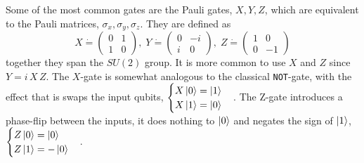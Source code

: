 Some of the most common gates are the Pauli gates, $X,Y,Z$, which are equivalent to the Pauli matrices, $\sigma_x,\sigma_y,\sigma_z$. 
They are defined as
\begin{equation}
X \dot{=}\begin{pmatrix}
0 & 1 \\ 1 & 0
\end{pmatrix},\; 
Y\dot{=}\begin{pmatrix}
0 & -i \\ i & 0
\end{pmatrix},\; 
Z \dot{=} \begin{pmatrix}
1 & 0 \\ 0 & -1
\end{pmatrix}
\end{equation}
together they span the $SU(2)$ group.  
It is more common to use $X$ and $Z$ since $Y = i\,X\,Z$. The $X$-gate is somewhat analogous to the classical {\tt NOT}-gate,  
with the effect that is swaps the input qubits, 
$\begin{cases} X\ket{0} = \ket{1}\\
X\ket{1} = \ket{0}
\end{cases}$.
The Z-gate introduces a phase-flip between the inputs, it does nothing to $\ket{0}$ and negates the sign of $\ket{1}$, $\begin{cases} Z\ket{0} = \ket{0}\\
Z\ket{1} = -\ket{0}
\end{cases}$.
 
